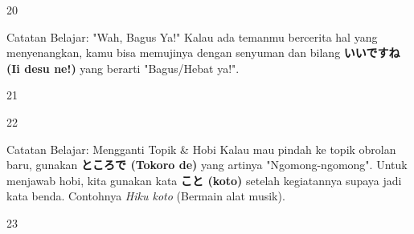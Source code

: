 \begin{convobox}{20}
    \noindent

    \vspace{1.5em}
\end{convobox}

\begin{lessonbox}{Catatan Belajar: "Wah, Bagus Ya!"}
    Kalau ada temanmu bercerita hal yang menyenangkan, kamu bisa memujinya dengan senyuman dan bilang \textbf{いいですね (Ii desu ne!)} yang berarti "Bagus/Hebat ya!".
\end{lessonbox}

\begin{convobox}{21}
    \noindent
      

    \vspace{1.5em}
\end{convobox}

\begin{convobox}{22}
    \noindent
      

    \vspace{1.5em}
\end{convobox}

\begin{lessonbox}{Catatan Belajar: Mengganti Topik \& Hobi}
    Kalau mau pindah ke topik obrolan baru, gunakan \textbf{ところで (Tokoro de)} yang artinya "Ngomong-ngomong". Untuk menjawab hobi, kita gunakan kata \textbf{こと (koto)} setelah kegiatannya supaya jadi kata benda. Contohnya \textit{Hiku koto} (Bermain alat musik).
\end{lessonbox}

\begin{convobox}{23}
    \noindent

    \vspace{1.5em}
\end{convobox}


